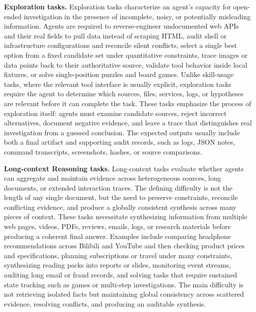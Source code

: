 \textbf{Exploration tasks.}
Exploration tasks characterize an agent's capacity for open-ended investigation in the presence of incomplete, noisy, or potentially misleading information. 
Agents are required to reverse-engineer undocumented web APIs and their real fields to pull data instead of scraping HTML, audit shell or infrastructure configurations and reconcile silent conflicts, select a single best option from a fixed candidate set under quantitative constraints, trace images or data points back to their authoritative source, validate tool behavior inside local fixtures, or solve single-position puzzles and board games. Unlike skill-usage tasks, where the relevant tool interface is usually explicit, exploration tasks require the agent to determine which sources, files, services, logs, or hypotheses are
relevant before it can complete the task. These tasks emphasize the process of exploration itself: agents must
examine candidate sources, reject incorrect alternatives, document negative evidence, and leave a trace that distinguishes real investigation from a guessed conclusion. The expected outputs usually include both a final artifact and supporting audit records, such as logs, JSON notes, command transcripts, screenshots, hashes, or source comparisons.

\textbf{Long-context Reasoning tasks.}
Long-context tasks evaluate whether agents can aggregate and maintain evidence across heterogeneous sources, long documents, or extended interaction traces.  The defining difficulty is not the length of any single document, but the need to preserve constraints, reconcile conflicting evidence, and produce a globally consistent synthesis across many pieces of context. These
tasks necessitate synthesizing information from multiple web pages, videos, PDFs, reviews, emails, logs, or research materials before producing a coherent final answer. Examples include comparing headphone recommendations across Bilibili and YouTube and then checking product prices and specifications, planning subscriptions or
travel under many constraints, synthesizing reading packs into reports or slides, monitoring event streams, auditing long email or fraud records, and solving tasks that require sustained state tracking such as games or multi-step investigations. The main difficulty is not retrieving isolated facts but maintaining global consistency across scattered evidence, resolving conflicts, and
producing an auditable synthesis.

